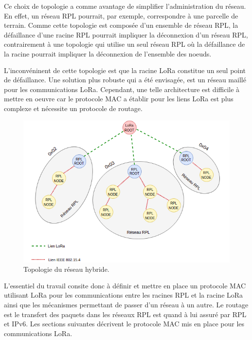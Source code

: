 Ce choix de topologie a comme avantage de simplifier l'administration du réseau. En effet, un réseau RPL pourrait, par exemple, correspondre à une parcelle de terrain. Comme cette topologie est composée d'un ensemble de réseau RPL, la défaillance d'une racine RPL pourrait impliquer la déconnexion d'un réseau RPL, contrairement à une topologie qui utilise un seul réseau RPL où la défaillance de la racine pourrait impliquer la déconnexion de l'ensemble des noeuds.

L'inconvéninent de cette topologie est que la racine LoRa constitue un seul point de défaillance. Une solution plus robuste qui a été envisagée, est un réseau maillé pour les communications LoRa. Cependant, une telle architecture est difficile à mettre en oeuvre car le protocole MAC a établir pour les liens LoRa est plus complexe et nécessite un protocole de routage.

\begin{figure}[H]
    \centering
    \includegraphics[scale=0.7]{res/pictures/loramac-topologie.drawio.png}
    \caption{Topologie du réseau hybride.}
    \label{fig:archi-topologie}
\end{figure}


L'essentiel du travail consite donc à définir et mettre en place un protocole MAC utilisant LoRa pour les communications entre les racines RPL et la racine LoRa ainsi que les mécanismes permettant de passer d'un réseau à un autre. Le routage est le transfert des paquets dans les réseaux RPL est quand à lui assuré par RPL et IPv6. Les sections suivantes décrivent le protocole MAC mis en place pour les communications LoRa.